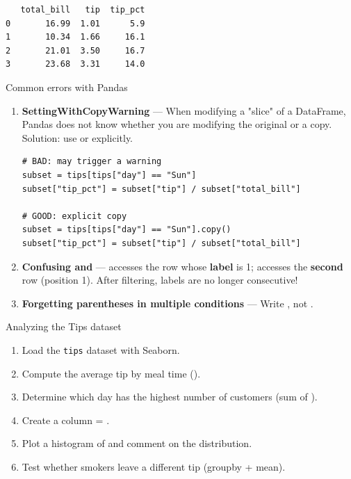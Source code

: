 \begin{codeoutput}
\begin{verbatim}
   total_bill   tip  tip_pct
0       16.99  1.01      5.9
1       10.34  1.66     16.1
2       21.01  3.50     16.7
3       23.68  3.31     14.0
\end{verbatim}
\end{codeoutput}

\begin{errmark}{Common errors with Pandas}
\begin{enumerate}
  \item \textbf{SettingWithCopyWarning} --- When modifying
    a "slice" of a DataFrame, Pandas does not know whether you are modifying the original
    or a copy. Solution: use  or  explicitly.
\begin{verbatim}
# BAD: may trigger a warning
subset = tips[tips["day"] == "Sun"]
subset["tip_pct"] = subset["tip"] / subset["total_bill"]

# GOOD: explicit copy
subset = tips[tips["day"] == "Sun"].copy()
subset["tip_pct"] = subset["tip"] / subset["total_bill"]
\end{verbatim}
  \item \textbf{Confusing  and } ---  accesses the row
    whose \textbf{label} is 1;  accesses the \textbf{second} row
    (position 1). After filtering, labels are no longer consecutive!
  \item \textbf{Forgetting parentheses in multiple conditions} ---
    Write , not .
\end{enumerate}
\end{errmark}

\begin{projet}{Analyzing the Tips dataset}
\begin{enumerate}
  \item Load the \texttt{tips} dataset with Seaborn.
  \item Compute the average tip by meal time ().
  \item Determine which day has the highest number of customers (sum of ).
  \item Create a column  = .
  \item Plot a histogram of  and comment on the distribution.
  \item Test whether smokers leave a different tip (groupby + mean).
\end{enumerate}
\end{projet}


